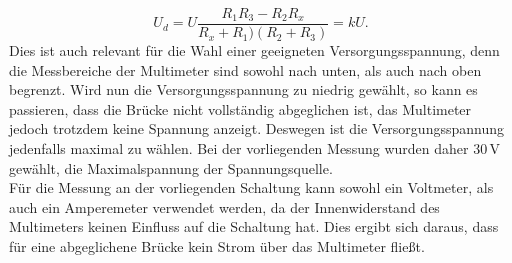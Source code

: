 \begin{equation}
	U_d = U \frac{R_1 R_3-R_2 R_x}{R_x+R_1)(R_2+R_3)} = k U.
\end{equation}
Dies ist auch relevant für die Wahl einer geeigneten Versorgungsspannung, denn die Messbereiche der Multimeter sind sowohl nach unten, als auch nach oben begrenzt. Wird nun die Versorgungsspannung zu niedrig gewählt, so kann es passieren, dass die Brücke nicht vollständig abgeglichen ist, das Multimeter jedoch trotzdem keine Spannung anzeigt. Deswegen ist die Versorgungsspannung jedenfalls maximal zu wählen. Bei der vorliegenden Messung wurden daher $30\,$V gewählt, die Maximalspannung der Spannungsquelle. \\
Für die Messung an der vorliegenden Schaltung kann sowohl ein Voltmeter, als auch ein Amperemeter verwendet werden, da der Innenwiderstand des Multimeters keinen Einfluss auf die Schaltung hat. Dies ergibt sich daraus, dass für eine abgeglichene Brücke kein Strom über das Multimeter fließt.

